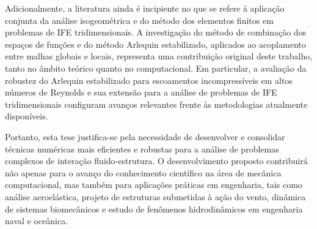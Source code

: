 Adicionalmente, a literatura ainda é incipiente no que se refere à aplicação conjunta da análise isogeométrica e do método dos elementos finitos em problemas de IFE tridimensionais. A investigação do método de combinação dos espaços de funções e do método Arlequin estabilizado, aplicados ao acoplamento entre malhas globais e locais, representa uma contribuição original deste trabalho, tanto no âmbito teórico quanto no computacional. Em particular, a avaliação da robustez do Arlequin estabilizado para escoamentos incompressíveis em altos números de Reynolds e sua extensão para a análise de problemas de IFE tridimensionais configuram avanços relevantes frente às metodologias atualmente disponíveis.
	
Portanto, esta tese justifica-se pela necessidade de desenvolver e consolidar técnicas numéricas mais eficientes e robustas para a análise de problemas complexos de interação fluido-estrutura. O desenvolvimento proposto contribuirá não apenas para o avanço do conhecimento científico na área de mecânica computacional, mas também para aplicações práticas em engenharia, tais como análise aeroelástica, projeto de estruturas submetidas à ação do vento, dinâmica de sistemas biomecânicos e estudo de fenômenos hidrodinâmicos em engenharia naval e oceânica.
